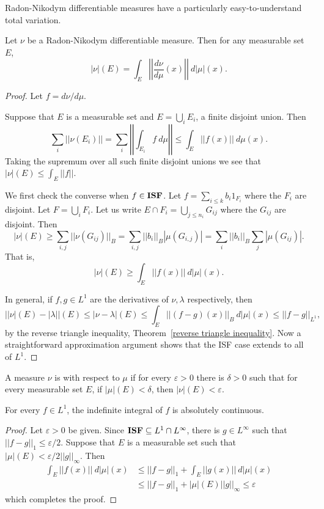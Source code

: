 Radon-Nikodym differentiable measures have a particularly easy-to-understand total variation.
\begin{theorem}
Let $\nu$ be a Radon-Nikodym differentiable measure. Then for any measurable set $E$,
\[|\nu|(E) = \int_{E} \left|\left|\frac{d\nu}{d\mu}(x)\right|\right|~d|\mu|(x).\]
\end{theorem}
\begin{proof}
Let $f = d\nu/d\mu$.

Suppose that $E$ is a measurable set and $E = \bigcup_{i} E_{i}$, a finite disjoint union. Then
\[\sum_{i} ||\nu(E_{i})|| = \sum_{i} \left|\left| \int_{E_{i}} f~d\mu\right|\right| \leq \int_{E} ||f(x)||~d\mu(x).\]
Taking the supremum over all such finite disjoint unions we see that $|\nu|(E) \leq \int_{E} ||f||$.

We first check the converse when $f \in \mathbf{ISF}$. Let $f = \sum_{i \leq k} b_{i} 1_{F_{i}}$ where the $F_{i}$ are disjoint.
Let $F = \bigcup_{i} F_{i}$.
Let us write $E \cap F_{i} = \bigcup_{j \leq n_{i}} G_{ij}$ where the $G_{ij}$ are disjoint. Then
\[|\nu|(E) \geq \sum_{i,j} ||\nu(G_{ij})||_{B} = \sum_{i,j} ||b_{i}||_{B} |\mu(G_{i,j})| = \sum_{i} ||b_{i}||_{B} \sum_{j} |\mu(G_{ij})|.\]
That is,
\[|\nu|(E) \geq \int_{E} ||f(x)|| ~d|\mu|(x).\]

In general, if $f,g \in L^{1}$ are the derivatives of $\nu,\lambda$ respectively, then
\[||\nu|(E) - |\lambda||(E) \leq |\nu - \lambda|(E) \leq \int_{E} ||(f - g)(x)||_{B} ~d|\mu|(x) \leq ||f - g||_{L^{1}},\]
by the reverse triangle inequality, Theorem~\ref{reverse triangle inequality}.
Now a straightforward approximation argument shows that the ISF case extends to all of $L^{1}$.
\end{proof}

\begin{definition}
A measure $\nu$ is  with respect to $\mu$ if for every $\varepsilon > 0$ there is $\delta > 0$ such that for every measurable set $E$, if $|\mu|(E) < \delta$, then $|\nu|(E) < \varepsilon$.
\end{definition}

\begin{theorem}\label{indefinite integral is abs cts}
For every $f \in L^{1}$, the indefinite integral of $f$ is absolutely continuous.
\end{theorem}
\begin{proof}
Let $\varepsilon > 0$ be given.
Since $\mathbf{ISF} \subseteq L^{1} \cap L^{\infty}$, there is $g \in L^{\infty}$ such that $||f - g||_{1} \leq \varepsilon/2$.
Suppose that $E$ is a measurable set such that $|\mu|(E) < \varepsilon/2||g||_{\infty}$. Then
\begin{align*}
\int_{E} ||f(x)|| ~d|\mu|(x) &\leq ||f - g||_{1} + \int_{E} ||g(x)|| ~d|\mu|(x) \\
&\leq ||f - g||_{1} + |\mu|(E)||g||_{\infty} \leq \varepsilon
\end{align*}
which completes the proof.
\end{proof}

